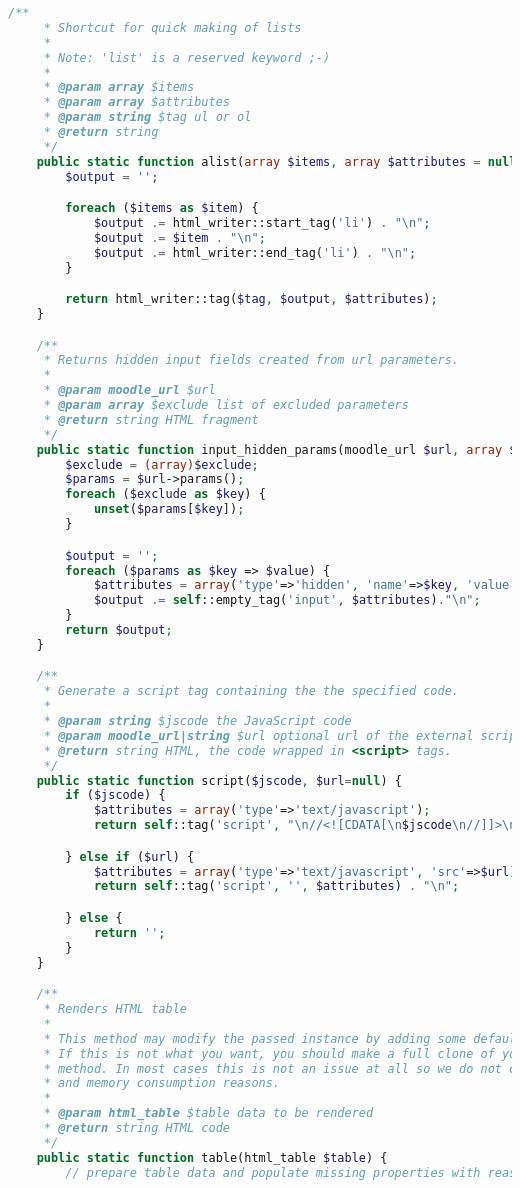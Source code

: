 \begin{lstlisting}[language=PHP]
    /**
     * Shortcut for quick making of lists
     *
     * Note: 'list' is a reserved keyword ;-)
     *
     * @param array $items
     * @param array $attributes
     * @param string $tag ul or ol
     * @return string
     */
    public static function alist(array $items, array $attributes = null, $tag = 'ul') {
        $output = '';

        foreach ($items as $item) {
            $output .= html_writer::start_tag('li') . "\n";
            $output .= $item . "\n";
            $output .= html_writer::end_tag('li') . "\n";
        }

        return html_writer::tag($tag, $output, $attributes);
    }

    /**
     * Returns hidden input fields created from url parameters.
     *
     * @param moodle_url $url
     * @param array $exclude list of excluded parameters
     * @return string HTML fragment
     */
    public static function input_hidden_params(moodle_url $url, array $exclude = null) {
        $exclude = (array)$exclude;
        $params = $url->params();
        foreach ($exclude as $key) {
            unset($params[$key]);
        }

        $output = '';
        foreach ($params as $key => $value) {
            $attributes = array('type'=>'hidden', 'name'=>$key, 'value'=>$value);
            $output .= self::empty_tag('input', $attributes)."\n";
        }
        return $output;
    }

    /**
     * Generate a script tag containing the the specified code.
     *
     * @param string $jscode the JavaScript code
     * @param moodle_url|string $url optional url of the external script, $code ignored if specified
     * @return string HTML, the code wrapped in <script> tags.
     */
    public static function script($jscode, $url=null) {
        if ($jscode) {
            $attributes = array('type'=>'text/javascript');
            return self::tag('script', "\n//<![CDATA[\n$jscode\n//]]>\n", $attributes) . "\n";

        } else if ($url) {
            $attributes = array('type'=>'text/javascript', 'src'=>$url);
            return self::tag('script', '', $attributes) . "\n";

        } else {
            return '';
        }
    }

    /**
     * Renders HTML table
     *
     * This method may modify the passed instance by adding some default properties if they are not set yet.
     * If this is not what you want, you should make a full clone of your data before passing them to this
     * method. In most cases this is not an issue at all so we do not clone by default for performance
     * and memory consumption reasons.
     *
     * @param html_table $table data to be rendered
     * @return string HTML code
     */
    public static function table(html_table $table) {
        // prepare table data and populate missing properties with reasonable defaults
        

\end{lstlisting}
